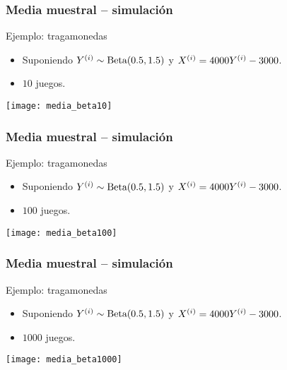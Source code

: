 \documentclass[table]{beamer}
\begin{document}
\begin{frame}
    \frametitle{Media muestral -- simulación}
    \begin{block}{Ejemplo: tragamonedas}
        \begin{itemize}
            \item Suponiendo $Y^{\parens{i}} \sim \betadist{0.5}{1.5}$ y $X^{\parens{i}} = 4000 Y^{\parens{i}} - 3000$.
            \item $10$ juegos.
        \end{itemize}
    \end{block}
    \begin{center}
        \texttt{[image: media\_beta10]}
    \end{center}
\end{frame}

\begin{frame}
    \frametitle{Media muestral -- simulación}
    \begin{block}{Ejemplo: tragamonedas}
        \begin{itemize}
            \item Suponiendo $Y^{\parens{i}} \sim \betadist{0.5}{1.5}$ y $X^{\parens{i}} = 4000 Y^{\parens{i}} - 3000$.
            \item $100$ juegos.
        \end{itemize}
    \end{block}
    \begin{center}
        \texttt{[image: media\_beta100]}
    \end{center}
\end{frame}

\begin{frame}
    \frametitle{Media muestral -- simulación}
    \begin{block}{Ejemplo: tragamonedas}
        \begin{itemize}
            \item Suponiendo $Y^{\parens{i}} \sim \betadist{0.5}{1.5}$ y $X^{\parens{i}} = 4000 Y^{\parens{i}} - 3000$.
            \item $1000$ juegos.
        \end{itemize}
    \end{block}
    \begin{center}
        \texttt{[image: media\_beta1000]}
    \end{center}
\end{frame}
\end{document}
